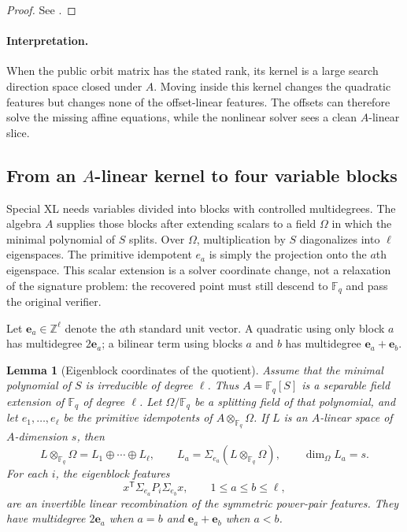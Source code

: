 \documentclass[11pt]{article}
\newtheorem{lemma}[lemma]{Lemma}
\newcommand{\F}{\mathbb F}
\newcommand{\transpose}{\mathsf T}
\begin{document}
\begin{proof}
See .
\end{proof}

\paragraph{Interpretation.}
When the public orbit matrix has the stated rank, its kernel is a large search
direction space closed under $A$.  Moving inside this kernel changes the
quadratic features but changes none of the offset-linear features.  The
offsets can therefore solve the missing affine equations, while the nonlinear
solver sees a clean $A$-linear slice.

\subsection{From an \texorpdfstring{$A$}{A}-linear kernel to four variable blocks}

Special XL needs variables divided into blocks with controlled
multidegrees.  The algebra $A$ supplies those blocks after extending scalars to
a field $\Omega$ in which the minimal polynomial of $S$ splits.  Over
$\Omega$, multiplication by $S$ diagonalizes into $\ell$ eigenspaces.  The
primitive idempotent $e_a$ is simply the projection onto the $a$th eigenspace.
This scalar extension is a solver coordinate change, not a relaxation of the
signature problem: the recovered point must still descend to $\F_q$ and pass
the original verifier.

Let $\mathbf e_a\in\mathbb Z^\ell$ denote the $a$th standard unit vector.  A
quadratic using only block $a$ has multidegree $2\mathbf e_a$; a bilinear term
using blocks $a$ and $b$ has multidegree
$\mathbf e_a+\mathbf e_b$.

\begin{lemma}[Eigenblock coordinates of the quotient]\label{lem:spectral-quotient}
Assume that the minimal polynomial of $S$ is irreducible of degree $\ell$.
Thus $A=\F_q[S]$ is a separable field extension of $\F_q$ of degree $\ell$.
Let $\Omega/\F_q$ be a splitting field of that polynomial, and let
$e_1,\ldots,e_\ell$ be the primitive idempotents of
$A\otimes_{\F_q}\Omega$.  If $L$ is an $A$-linear space of $A$-dimension
$s$, then
\[
 L\otimes_{\F_q}\Omega=L_1\oplus\cdots\oplus L_\ell,
 \qquad L_a=\Sigma_{e_a}(L\otimes_{\F_q}\Omega),
 \qquad \dim_\Omega L_a=s.
\]
For each $i$, the eigenblock features
\[
 x^\transpose\Sigma_{e_a}P_i\Sigma_{e_b}x,
 \qquad 1\le a\le b\le\ell,
\]
are an invertible linear recombination of the symmetric power-pair features.
They have multidegree $2\mathbf e_a$ when $a=b$ and
$\mathbf e_a+\mathbf e_b$ when $a<b$.
\end{lemma}
\end{document}
